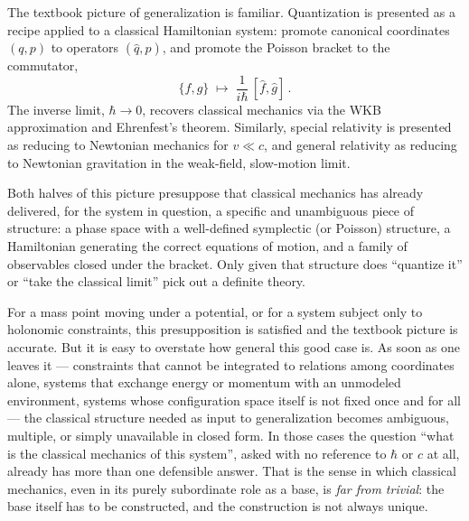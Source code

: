 The textbook picture of generalization is familiar. Quantization is presented as
a recipe applied to a classical Hamiltonian system: promote canonical coordinates
$(q,p)$ to operators $(\hat q,\hat p)$, and promote the Poisson bracket to the
commutator,
\begin{equation}
  \{f,g\} \;\longmapsto\; \frac{1}{i\hbar}\,[\hat f,\hat g] \, .
\end{equation}
The inverse limit, $\hbar \to 0$, recovers classical mechanics via the WKB
approximation and Ehrenfest's theorem. Similarly, special relativity is presented
as reducing to Newtonian mechanics for $v \ll c$, and general relativity as
reducing to Newtonian gravitation in the weak-field, slow-motion limit.

Both halves of this picture presuppose that classical mechanics has already
delivered, for the system in question, a specific and unambiguous piece of
structure: a phase space with a well-defined symplectic (or Poisson) structure,
a Hamiltonian generating the correct equations of motion, and a family of
observables closed under the bracket. Only given that structure does
``quantize it'' or ``take the classical limit'' pick out a definite theory.

For a mass point moving under a potential, or for a system subject only to
holonomic constraints, this presupposition is satisfied and the textbook picture
is accurate. But it is easy to overstate how general this good case is. As soon
as one leaves it --- constraints that cannot be integrated to relations among
coordinates alone, systems that exchange energy or momentum with an unmodeled
environment, systems whose configuration space itself is not fixed once and for
all --- the classical structure needed as input to generalization becomes
ambiguous, multiple, or simply unavailable in closed form. In those cases the
question ``what is the classical mechanics of this system'', asked with no
reference to $\hbar$ or $c$ at all, already has more than one defensible answer.
That is the sense in which classical mechanics, even in its purely subordinate
role as a base, is \emph{far from trivial}: the base itself has to be constructed,
and the construction is not always unique.


